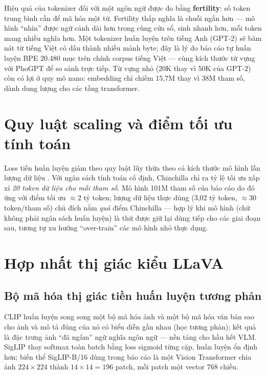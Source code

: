 Hiệu quả của tokenizer đối với một ngôn ngữ được đo bằng \textbf{fertility}:
số token trung bình cần để mã hóa một từ. Fertility thấp nghĩa là chuỗi ngắn
hơn --- mô hình ``nhìn'' được ngữ cảnh dài hơn trong cùng cửa sổ, sinh nhanh
hơn, mỗi token mang nhiều nghĩa hơn. Một tokenizer huấn luyện trên tiếng Anh
(GPT-2) sẽ băm nát từ tiếng Việt có dấu thành nhiều mảnh byte; đây là lý do
báo cáo tự huấn luyện BPE 20.480 mục trên chính corpus tiếng Việt --- cùng
kích thước từ vựng với PhoGPT \autocite{nguyen2023phogpt} để so sánh trực
tiếp. Từ vựng nhỏ (20K thay vì 50K của GPT-2) còn có lợi ở quy mô nano:
embedding chỉ chiếm 15,7M thay vì 38M tham số, dành dung lượng cho các tầng
transformer.

\section{Quy luật scaling và điểm tối ưu tính toán}
\label{sec:bg-scaling}

Loss tiền huấn luyện giảm theo quy luật lũy thừa theo cả kích thước mô hình
lẫn lượng dữ liệu \autocite{kaplan2020scaling}. Với ngân sách tính toán cố
định, Chinchilla \autocite{hoffmann2022chinchilla} chỉ ra tỷ lệ tối ưu xấp xỉ
\emph{20 token dữ liệu cho mỗi tham số}. Mô hình 101M tham số của báo cáo do
đó ứng với điểm tối ưu $\approx 2$ tỷ token; lượng dữ liệu thực dùng (3,02 tỷ
token, $\approx 30$ token/tham số) chủ đích nằm \emph{quá} điểm Chinchilla ---
hợp lý khi mô hình (chứ không phải ngân sách huấn luyện) là thứ được giữ lại
dùng tiếp cho các giai đoạn sau, tương tự xu hướng ``over-train'' các mô hình
nhỏ thực dụng.

\section{Hợp nhất thị giác kiểu LLaVA}
\label{sec:bg-fusion}

\subsection{Bộ mã hóa thị giác tiền huấn luyện tương phản}

CLIP \autocite{radford2021clip} huấn luyện song song một bộ mã hóa ảnh và một
bộ mã hóa văn bản sao cho ảnh và mô tả đúng của nó có biểu diễn gần nhau
(học tương phản); kết quả là đặc trưng ảnh ``đã ngấm'' ngữ nghĩa ngôn ngữ ---
nền tảng cho hầu hết VLM. SigLIP \autocite{zhai2023siglip} thay softmax toàn
batch bằng loss sigmoid từng cặp, huấn luyện ổn định hơn; biến thể SigLIP-B/16
dùng trong báo cáo là một Vision Transformer \autocite{dosovitskiy2021vit}
chia ảnh $224 \times 224$ thành $14 \times 14 = 196$ patch, mỗi patch một
vector 768 chiều.

